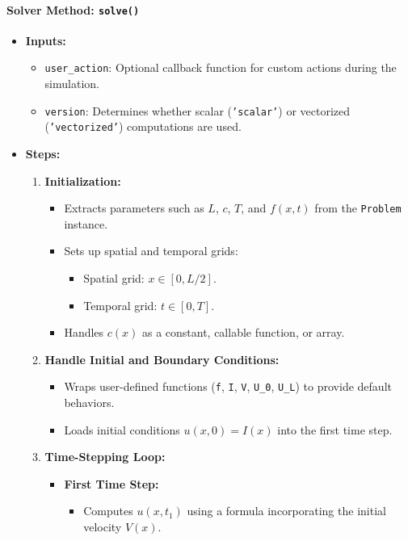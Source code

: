 \documentclass{article}
\begin{document}
			\paragraph{Solver Method: \texttt{solve()}}
			\begin{itemize}
				\item \textbf{Inputs:}
				\begin{itemize}
					\item \texttt{user\_action}: Optional callback function for custom actions during the simulation.
					\item \texttt{version}: Determines whether scalar (\texttt{'scalar'}) or vectorized (\texttt{'vectorized'}) computations are used.
				\end{itemize}
				\item \textbf{Steps:}
				\begin{enumerate}
					\item \textbf{Initialization:}
					\begin{itemize}
						\item Extracts parameters such as \( L \), \( c \), \( T \), and \( f(x, t) \) from the \texttt{Problem} instance.
						\item Sets up spatial and temporal grids:
						\begin{itemize}
							\item Spatial grid: \( x \in [0, L/2] \).
							\item Temporal grid: \( t \in [0, T] \).
						\end{itemize}
						\item Handles \( c(x) \) as a constant, callable function, or array.
					\end{itemize}
					\item \textbf{Handle Initial and Boundary Conditions:}
					\begin{itemize}
						\item Wraps user-defined functions (\texttt{f}, \texttt{I}, \texttt{V}, \texttt{U\_0}, \texttt{U\_L}) to provide default behaviors.
						\item Loads initial conditions \( u(x, 0) = I(x) \) into the first time step.
					\end{itemize}
					\item \textbf{Time-Stepping Loop:}
					\begin{itemize}
						\item \textbf{First Time Step:}
						\begin{itemize}
							\item Computes \( u(x, t_1) \) using a formula incorporating the initial velocity \( V(x) \).

\end{itemize}
\end{itemize}
\end{enumerate}
\end{itemize}
\end{document}
